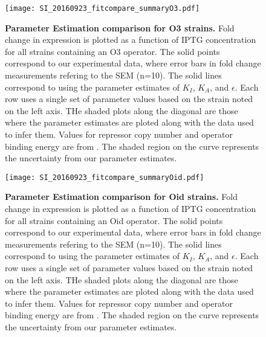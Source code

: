 \begin{figure}[h]
	\centering \texttt{[image: SI\_20160923\_fitcompare\_summaryO3.pdf]}
	\caption{{\bf Parameter Estimation comparison for O3 strains.} Fold change in expression is plotted as a function of IPTG concentration for all strains containing an O3 operator. The solid points correspond to our experimental data, where error bars in fold change measurements refering to the SEM (n=10). The solid lines correspond to \eref[eq7] using the parameter estimates of $K_I$, $K_A$, and $\epsilon$. Each row uses a single set of parameter values based on the strain noted on the left axis. THe shaded plots along the diagonal are those where the parameter estimates are ploted along with the data used to infer them. Values for repressor copy number and operator binding energy are from \cite{Garcia2011}.  The shaded region on the curve represents the uncertainty from our parameter estimates.}
	\label{SIfig9}
\end{figure}

\begin{figure}[h]
	\centering \texttt{[image: SI\_20160923\_fitcompare\_summaryOid.pdf]}
	\caption{{\bf Parameter Estimation comparison for Oid strains.} Fold change in expression is plotted as a function of IPTG concentration for all strains containing an Oid operator. The solid points correspond to our experimental data, where error bars in fold change measurements refering to the SEM (n=10). The solid lines correspond to \eref[eq7] using the parameter estimates of $K_I$, $K_A$, and $\epsilon$. Each row uses a single set of parameter values based on the strain noted on the left axis. THe shaded plots along the diagonal are those where the parameter estimates are ploted along with the data used to infer them. Values for repressor copy number and operator binding energy are from \cite{Garcia2011}.  The shaded region on the curve represents the uncertainty from our parameter estimates.}
	\label{SIfig10}
\end{figure}


